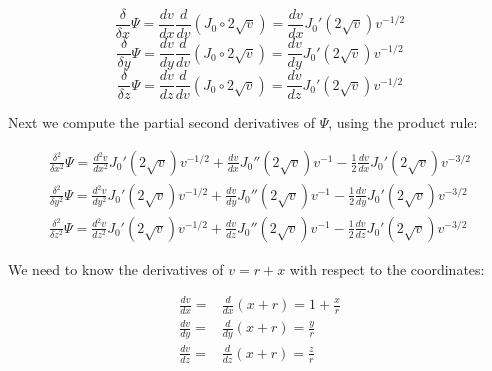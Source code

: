 \documentclass{article}
\begin{document}

\begin{equation}
\frac{\delta}{\delta x} \Psi = \frac{d v}{d x} \frac{d}{d v} \left(J_0 \circ 2\sqrt{v}\right) = \frac{d v}{d x} J_0'(2\sqrt{v}) v^{-1/2}
\end{equation}
\begin{equation}
\frac{\delta}{\delta y} \Psi = \frac{d v}{d y} \frac{d}{d v} \left(J_0 \circ 2\sqrt{v}\right) = \frac{d v}{d y} J_0'(2\sqrt{v}) v^{-1/2}
\end{equation}
\begin{equation}
\frac{\delta}{\delta z} \Psi = \frac{d v}{d z} \frac{d}{d v} \left(J_0 \circ 2\sqrt{v}\right) = \frac{d v}{d z} J_0'(2\sqrt{v}) v^{-1/2}
\end{equation}

Next we compute the partial second derivatives of $\Psi$, using the product rule:

\begin{subequations}
\label{second partials}
\begin{align}
\frac{\delta^2}{\delta x^2} \Psi = \frac{d^2 v}{d x^2} J_0'(2\sqrt{v}) v^{-1/2} + \frac{d v}{d x} J_0''(2\sqrt{v}) v^{-1} - \frac{1}{2} \frac{d v}{d x} J_0'(2\sqrt{v}) v^{-3/2} \\
\frac{\delta^2}{\delta y^2} \Psi = \frac{d^2 v}{d y^2} J_0'(2\sqrt{v}) v^{-1/2} + \frac{d v}{d y} J_0''(2\sqrt{v}) v^{-1} - \frac{1}{2} \frac{d v}{d y} J_0'(2\sqrt{v}) v^{-3/2} \\
\frac{\delta^2}{\delta z^2} \Psi = \frac{d^2 v}{d z^2} J_0'(2\sqrt{v}) v^{-1/2} + \frac{d v}{d z} J_0''(2\sqrt{v}) v^{-1} - \frac{1}{2} \frac{d v}{d z} J_0'(2\sqrt{v}) v^{-3/2}
\end{align}
\end{subequations}

We need to know the derivatives of $v=r+x$ with respect to the coordinates:

\begin{subequations}
\label{first v}
\begin{align}
\frac{d v}{d x} = & \frac{d}{d x} (x+r) = 1 + \frac{x}{r} \\
\frac{d v}{d y} = & \frac{d}{d y} (x+r) = \frac{y}{r} \\
\frac{d v}{d z} = & \frac{d}{d z} (x+r) = \frac{z}{r}
\end{align}
\end{subequations}
\end{document}

